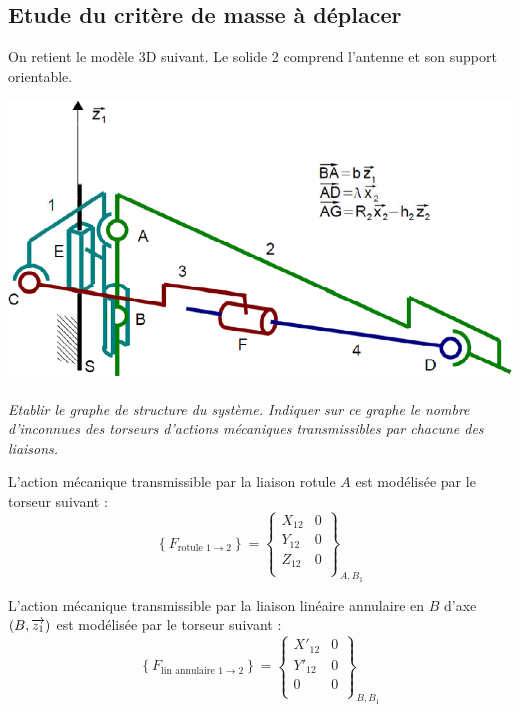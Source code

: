 \documentclass[10pt,oneside]{article}
\begin{document}
\subsection*{Etude du critère de masse à déplacer}

On retient le modèle 3D suivant. Le solide 2 comprend l'antenne et son support orientable. 


\begin{center}
\includegraphics[width=.9\textwidth]{png/img4}
\end{center}

\paragraph{}
\textit{Etablir le graphe de structure du système. Indiquer sur ce graphe le nombre d'inconnues des torseurs d'actions mécaniques transmissibles par chacune des liaisons.}

L'action mécanique transmissible par la liaison rotule $A$ est modélisée par le torseur suivant :
$$
\left\{
F_{\text{rotule 1}\rightarrow 2} 
\right\}=
\left\{
\begin{array}{cc}
X_{12} & 0 \\
Y_{12} & 0 \\
Z_{12} & 0 \\
\end{array}
\right\}_{A,B_1}
$$

L'action mécanique transmissible par la liaison linéaire annulaire en $B$ d'axe $(B,\overrightarrow{z_1})$ est modélisée par le torseur suivant :
$$
\left\{
F_{\text{lin annulaire }1\rightarrow 2} 
\right\}=
\left\{
\begin{array}{cc}
X'_{12} & 0 \\
Y'_{12} & 0 \\
0 & 0 \\
\end{array}
\right\}_{B,B_1}
$$
\end{document}
